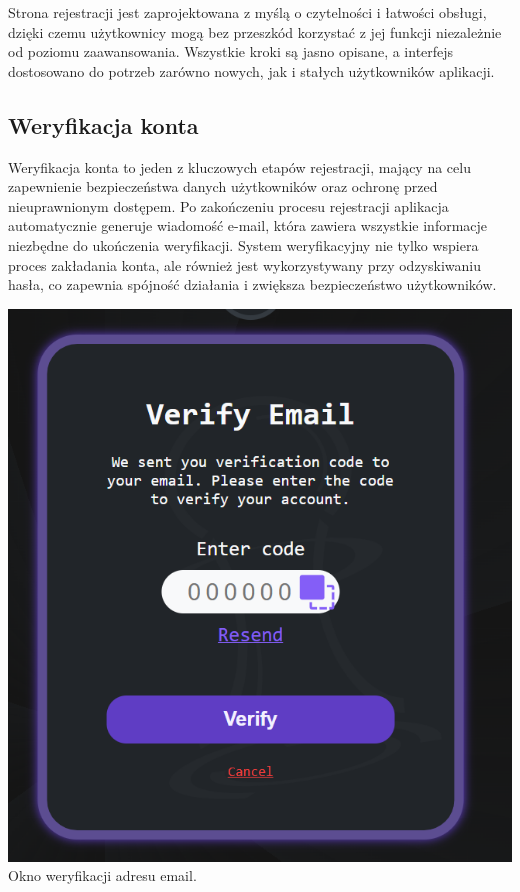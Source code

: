 \documentclass[12pt,a4paper]{article}
\begin{document}
\noindent
Strona rejestracji jest zaprojektowana z myślą o czytelności i łatwości obsługi, dzięki czemu użytkownicy mogą bez przeszkód korzystać z jej funkcji niezależnie od poziomu zaawansowania. Wszystkie kroki są jasno opisane, a interfejs dostosowano do potrzeb zarówno nowych, jak i stałych użytkowników aplikacji.

\newpage

\subsection{Weryfikacja konta}

\begin{minipage}[t]{0.55\textwidth} 
    \vspace{0pt} 
    \justifying 
    \noindent 
    Weryfikacja konta to jeden z kluczowych etapów rejestracji, mający na celu zapewnienie bezpieczeństwa danych użytkowników oraz ochronę przed nieuprawnionym dostępem. Po zakończeniu procesu rejestracji aplikacja automatycznie generuje wiadomość e-mail, która zawiera wszystkie informacje niezbędne do ukończenia weryfikacji. System weryfikacyjny nie tylko wspiera proces zakładania konta, ale również jest wykorzystywany przy odzyskiwaniu hasła, co zapewnia spójność działania i zwiększa bezpieczeństwo użytkowników. 
\end{minipage} 
\hfill 
\begin{minipage}[t]{0.35\textwidth} 
    \vspace{0pt} 
    \centering 
    \includegraphics[width=\linewidth]{images/ins_min_ver.png} 
    Okno weryfikacji adresu email.
\end{minipage}
\end{document}
